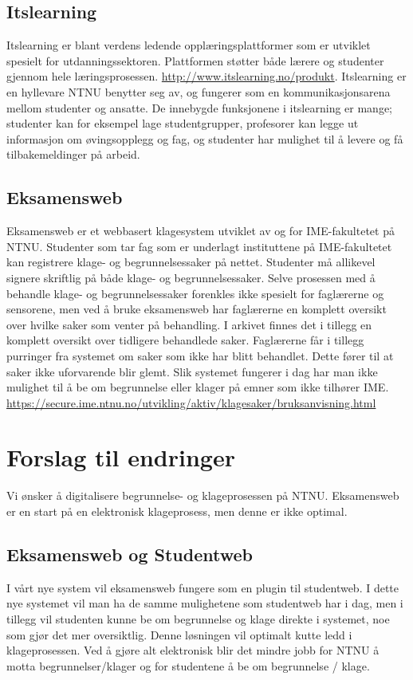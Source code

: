 \documentclass[12pt]{article}
\begin{document}
\subsection{Itslearning}

Itslearning er blant verdens ledende opplæringsplattformer som er utviklet spesielt for utdanningssektoren. Plattformen støtter både lærere og studenter gjennom hele læringsprosessen. \url{http://www.itslearning.no/produkt}. Itslearning er en hyllevare NTNU benytter seg av, og fungerer som en kommunikasjonsarena mellom studenter og ansatte. De innebygde funksjonene i itslearning er mange; studenter kan for eksempel  lage studentgrupper, profesorer kan legge ut informasjon om øvingsopplegg og fag, og studenter har mulighet til å levere og få tilbakemeldinger på arbeid.

\subsection{Eksamensweb}
Eksamensweb er et webbasert klagesystem utviklet av og for IME-fakultetet på NTNU. Studenter som tar fag som er underlagt instituttene på IME-fakultetet kan registrere klage- og begrunnelsessaker på nettet. Studenter må allikevel signere skriftlig på både klage- og begrunnelsessaker. Selve prosessen med å behandle klage- og begrunnelsessaker forenkles ikke spesielt for faglærerne og sensorene, men ved å bruke eksamensweb har faglærerne en komplett oversikt over hvilke saker som venter på behandling. I arkivet finnes det i tillegg en komplett oversikt over tidligere behandlede saker. Faglærerne får i tillegg purringer fra systemet om saker som ikke har blitt behandlet. Dette fører til at saker ikke uforvarende blir glemt. Slik systemet fungerer i dag har man ikke mulighet til å be om begrunnelse eller klager på emner som ikke tilhører IME.
\url{https://secure.ime.ntnu.no/utvikling/aktiv/klagesaker/bruksanvisning.html}


\section{Forslag til endringer}
Vi ønsker å digitalisere begrunnelse- og klageprosessen på NTNU. Eksamensweb er en start på en elektronisk klageprosess, men denne er ikke optimal.

\subsection*{Eksamensweb og Studentweb}
I vårt nye system vil eksamensweb fungere som en plugin til studentweb. I dette nye systemet vil man ha de samme mulighetene som studentweb har i dag, men i tillegg vil studenten kunne be om begrunnelse og klage direkte i systemet, noe som gjør det mer oversiktlig. Denne løsningen vil optimalt kutte ledd i klageprosessen. Ved å gjøre alt elektronisk blir det mindre jobb for NTNU å motta begrunnelser/klager og for studentene å be om begrunnelse / klage.
\end{document}
